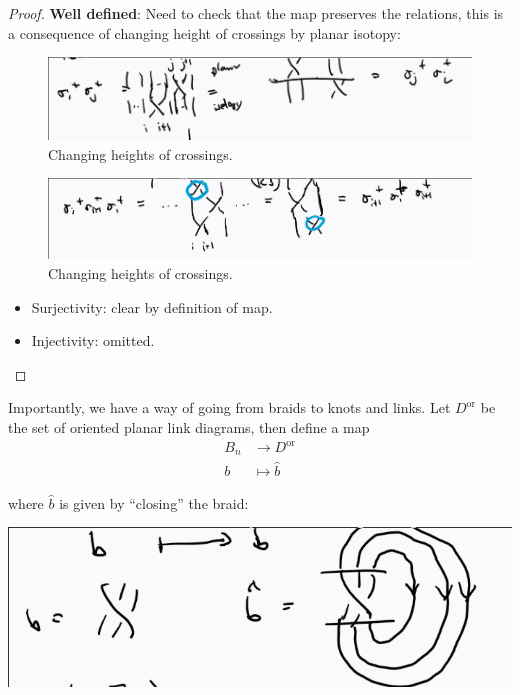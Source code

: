 \begin{proof}

\hfill

\textbf{Well defined}: Need to check that the map preserves the
relations, this is a consequence of changing height of crossings by
planar isotopy:

\begin{figure}
\centering
\includegraphics{figures/image_2020-07-08-11-56-18.png}
\caption{Changing heights of crossings.}
\end{figure}

\begin{figure}
\centering
\includegraphics{figures/image_2020-07-08-11-57-06.png}
\caption{Changing heights of crossings.}
\end{figure}

\begin{itemize}
\item
  Surjectivity: clear by definition of map.
\item
  Injectivity: omitted.
\end{itemize}

\end{proof}

\begin{remark}

Importantly, we have a way of going from braids to knots and links. Let
\(D^{\text{or}}\) be the set of oriented planar link diagrams, then
define a map
\begin{align*}
B_n &\to D^{\text{or}} \\
b &\mapsto \hat b
\end{align*}

where \(\hat b\) is given by ``closing'' the braid:

\includegraphics{figures/image_2020-07-08-12-00-35.png}

\end{remark}

